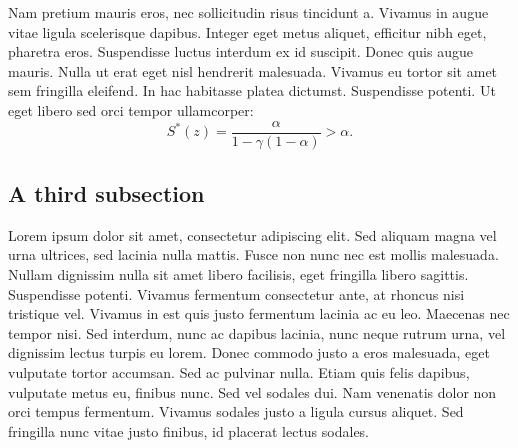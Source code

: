 \documentclass[letterpaper,11pt,leqno]{article}
\newcommand{\bib}{bibliography.bib}
\begin{document}
Nam pretium mauris eros, nec sollicitudin risus tincidunt a. Vivamus in augue vitae ligula scelerisque dapibus. Integer eget metus aliquet, efficitur nibh eget, pharetra eros. Suspendisse luctus interdum ex id suscipit. Donec quis augue mauris. Nulla ut erat eget nisl hendrerit malesuada. Vivamus eu tortor sit amet sem fringilla eleifend. In hac habitasse platea dictumst. Suspendisse potenti. Ut eget libero sed orci tempor ullamcorper:
\begin{equation}
S^*(z) = \frac{\alpha}{1-\gamma (1-\alpha)} > \alpha.
\label{e:type1Classical}\end{equation}

\subsection{A third subsection}

Lorem ipsum dolor sit amet, consectetur adipiscing elit. Sed aliquam magna vel urna ultrices, sed lacinia nulla mattis. Fusce non nunc nec est mollis malesuada. Nullam dignissim nulla sit amet libero facilisis, eget fringilla libero sagittis. Suspendisse potenti. Vivamus fermentum consectetur ante, at rhoncus nisi tristique vel. Vivamus in est quis justo fermentum lacinia ac eu leo. Maecenas nec tempor nisi. Sed interdum, nunc ac dapibus lacinia, nunc neque rutrum urna, vel dignissim lectus turpis eu lorem. Donec commodo justo a eros malesuada, eget vulputate tortor accumsan. Sed ac pulvinar nulla. Etiam quis felis dapibus, vulputate metus eu, finibus nunc. Sed vel sodales dui. Nam venenatis dolor non orci tempus fermentum. Vivamus sodales justo a ligula cursus aliquet. Sed fringilla nunc vitae justo finibus, id placerat lectus sodales.


\end{document}
